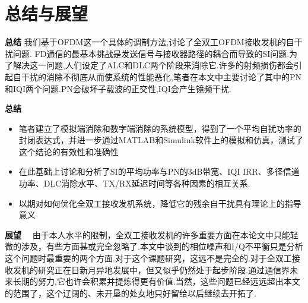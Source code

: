 \section{总结与展望}
    
    \frame{\sectionpage}
    
     \begin{frame}{\textbf{总结}}
     	我们基于OFDM这一个具体的调制方法,讨论了全双工OFDM接收发机的自干扰问题.
     	FD通信的最基本挑战是发送信号与接收器路径的耦合而导致的SI问题.为了解决这一问题,人们设定了ALC和DLC两个阶段来消除它.许多的射频损伤都会引起自干扰的消除不彻底从而使系统的性能恶化,笔者在本文中主要讨论了其中的PN和IQI两个问题.PN会破坏子载波的正交性,IQI会产生镜频干扰.	
	\end{frame}

	\begin{frame}{\textbf{总结}}
		\begin{itemize}
			\item 笔者建立了模拟端消除和数字端消除的系统模型，得到了一个平均自扰功率的封闭表达式，并进一步通过MATLAB和Simulink软件上的模拟和仿真，测试了这个结论的有效性和准确性
			\item 在此基础上讨论和分析了SI的平均功率与PN的3dB带宽、IQI IRR、多径信道功率、DLC消除水平、TX/RX延迟时间等各种因素的相互关系.
			\item 以期对如何优化全双工接收发机系统，降低它的残余自干扰具有理论上的指导意义
		\end{itemize}
	\end{frame}

	\begin{frame}{\textbf{展望}}
		$\quad$由于本人水平的限制，全双工接收发机的许多重要方面在本论文中只能轻微的涉及，有些方面甚或完全忽略了.本文中谈到的相位噪声和I/Q不平衡只是分析这个问题时最重要的两个方面.对于这个课题研究，这远不是完全的.对于全双工接收发机的研究正在日新月异地发展中，但又似乎仍然处于起步阶段.通过通信界未来长期的努力,它也许会积累并提炼得更有价值.当然，这些问题已经远远超出本文的范围了，这个辽阔的、未开垦的处女地只好留给以后继续去开拓了.
	\end{frame}
